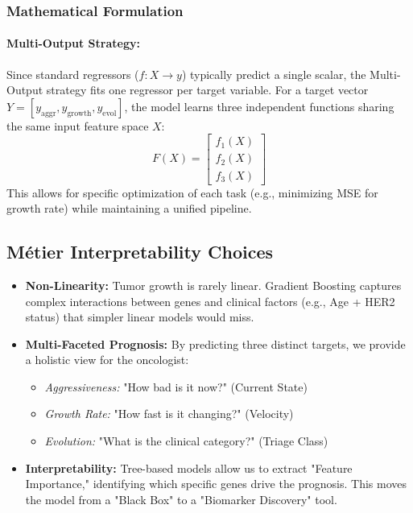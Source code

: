 \subsubsection{Mathematical Formulation}

\paragraph{Multi-Output Strategy:}
Since standard regressors ($f: X \to y$) typically predict a single scalar, the Multi-Output strategy fits one regressor per target variable. For a target vector $Y = [y_{\text{aggr}}, y_{\text{growth}}, y_{\text{evol}}]$, the model learns three independent functions sharing the same input feature space $X$:
\[ F(X) = \begin{bmatrix} f_1(X) \\ f_2(X) \\ f_3(X) \end{bmatrix} \]
This allows for specific optimization of each task (e.g., minimizing MSE for growth rate) while maintaining a unified pipeline.

\subsection{Métier Interpretability Choices}
\begin{itemize}
    \item \textbf{Non-Linearity:} Tumor growth is rarely linear. Gradient Boosting captures complex interactions between genes and clinical factors (e.g., Age + HER2 status) that simpler linear models would miss.
    \item \textbf{Multi-Faceted Prognosis:} By predicting three distinct targets, we provide a holistic view for the oncologist:
    \begin{itemize}
        \item \textit{Aggressiveness:} "How bad is it now?" (Current State)
        \item \textit{Growth Rate:} "How fast is it changing?" (Velocity)
        \item \textit{Evolution:} "What is the clinical category?" (Triage Class)
    \end{itemize}
    \item \textbf{Interpretability:} Tree-based models allow us to extract "Feature Importance," identifying which specific genes drive the prognosis. This moves the model from a "Black Box" to a "Biomarker Discovery" tool.
\end{itemize}
